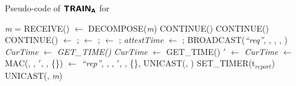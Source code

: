 \begin{algorithm}[hbt!]
\footnotesize
\caption{Pseudo-code of $\boldsymbol{{\sf{TRAIN_{A}}}}$ for \prv}\label{alg:rtc_prv}
    \begin{algorithmic}[1]
        \State \textit{m} = RECEIVE()
            \State [\snd, \hashind, \hash, \attesttime] $\gets$ DECOMPOSE(\textit{m})
            \If {$\curhashind <= \hashind$}
                \State CONTINUE() 
            \EndIf
                \State CONTINUE() 
            \EndIf
                \State CONTINUE()
            \EndIf
             \State \parent $\gets$ \snd; \curhashind $\gets$ \hashind; \curhash $\gets$ \hash; \textit{attestTime} $\gets$ \attesttime;
             \State BROADCAST(\textit{``req''}, \devid, \curhashind, \curhash, \attesttime)
             \State \textit{CurTime} $\gets$ \textit{GET\_TIME()} 
              
             \State \textit{CurTime} $\gets$ GET\_TIME()
             \EndWhile
             \State \attesttime$'$ $\gets$ \textit{CurTime}
             \State \Authrep $\gets$ MAC(\key, \parent, \attesttime$'$, \hash, \{\lmt\})
             \State \Attrep $\gets$ \textit{``rep''}, \devid, \parent, \attesttime$'$,  \hash, \{\lmt\}, \Authrep
             \State UNICAST(\parent, \Attrep)
             \State SET\_TIMER(\height*t$_{report}$)
        \EndIf
                     \State UNICAST(\parent, \textit{m})
                 \EndIf
        \EndIf
    \EndWhile
    \end{algorithmic}
\end{algorithm}


